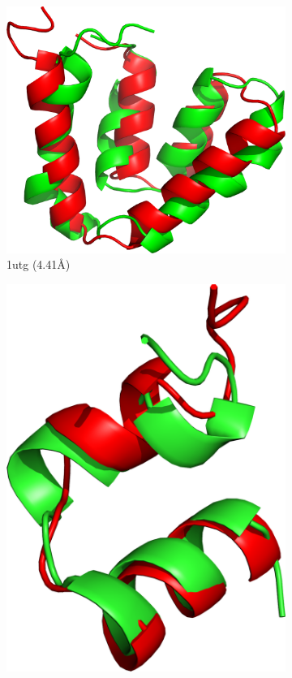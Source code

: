 \begin{figure}
\begin{subfigure}{0.32\linewidth}
    \includegraphics[width=0.9\linewidth]{Figuras/prots/1utg_render.png}
    \caption{1utg (4.41\AA)}
    \label{fig:1utg-conformation}
  \end{subfigure}
  \begin{subfigure}{0.32\linewidth}
    \centering
    \includegraphics[width=0.9\linewidth]{Figuras/prots/1wqc_render.png}

\end{subfigure}
\end{figure}

